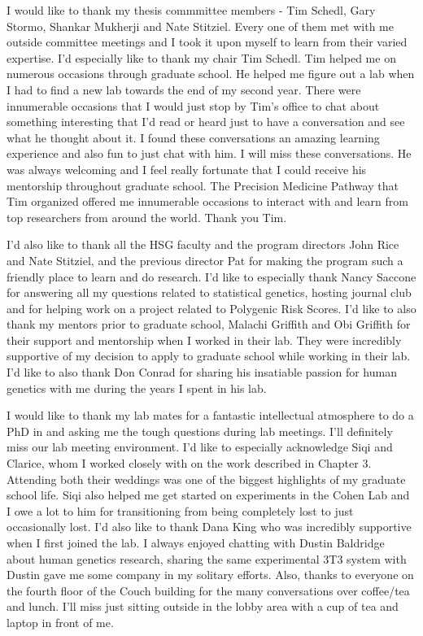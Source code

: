 I would like to thank my thesis commmittee members - Tim Schedl, Gary Stormo, Shankar Mukherji and Nate Stitziel. Every one of them met with me outside committee meetings and I took it upon myself to learn from their varied expertise. I'd especially like to thank my chair Tim Schedl. Tim helped me on numerous occasions through graduate school. He helped me figure out a lab when I had to find a new lab towards the end of my second year. There were innumerable occasions that I would just stop by Tim's office to chat about something interesting that I'd read or heard just to have a conversation and see what he thought about it. I found these conversations an amazing learning experience and also fun to just chat with him. I will miss these conversations. He was always welcoming and I feel really fortunate that I could receive his mentorship throughout graduate school. The Precision Medicine Pathway that Tim organized offered me innumerable occasions to interact with and learn from top researchers from around the world. Thank you Tim.

I'd also like to thank all the HSG faculty and the program directors John Rice and Nate Stitziel, and the previous director Pat for making the program such a friendly place to learn and do research. I'd like to especially thank Nancy Saccone for answering all my questions related to statistical genetics, hosting journal club and for helping work on a project related to Polygenic Risk Scores. I'd like to also thank my mentors prior to graduate school, Malachi Griffith and Obi Griffith for their support and mentorship when I worked in their lab. They were incredibly supportive of my decision to apply to graduate school while working in their lab. I'd like to also thank Don Conrad for sharing his insatiable passion for human genetics with me during the years I spent in his lab.

I would like to thank my lab mates for a fantastic intellectual atmosphere to do a PhD in and asking me the tough questions during lab meetings. I'll definitely miss our lab meeting environment. I'd like to especially acknowledge Siqi and Clarice, whom I worked closely with on the work described in Chapter 3. Attending both their weddings was one of the biggest highlights of my graduate school life. Siqi also helped me get started on experiments in the Cohen Lab and I owe a lot to him for transitioning from being completely lost to just occasionally lost. I'd also like to thank Dana King who was incredibly supportive when I first joined the lab. I always enjoyed chatting with Dustin Baldridge about human genetics research, sharing the same experimental 3T3 system with Dustin gave me some company in my solitary efforts. Also, thanks to everyone on the fourth floor of the Couch building for the many conversations over coffee/tea and lunch. I'll miss just sitting outside in the lobby area with a cup of tea and laptop in front of me.

